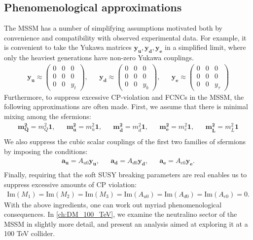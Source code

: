 \subsection{Phenomenological approximations}
The MSSM has a number of simplifying assumptions motivated both by convenience and compatibility with observed experimental data. For example, it is convenient to take the Yukawa matrices $\mathbf{y_u,y_d,y_e}$ in a simplified limit, where only the heaviest generations have non-zero Yukawa couplings. 
\begin{align*}
  \mathbf{y_u} \approx \begin{pmatrix}
    0 & 0 & 0\\
    0 & 0 & 0\\
    0 & 0 & y_t
  \end{pmatrix},&&
  \mathbf{y_d} \approx \begin{pmatrix}
    0 & 0 & 0\\
    0 & 0 & 0\\
    0 & 0 & y_b
  \end{pmatrix},&&
  \mathbf{y_e} \approx \begin{pmatrix}
    0 & 0 & 0\\
    0 & 0 & 0\\
    0 & 0 & y_\tau
  \end{pmatrix}
\end{align*}
Furthermore, to suppress excessive CP-violation and FCNCs in the MSSM, the following approximations are often made. First, we assume that there is minimal mixing among the sfermions:
\begin{align*}
  \mathbf{m_Q^2} = m_Q^2\mathbf{1},&&
  \mathbf{m_{\bar{u}}^2} = m_{\bar{u}}^2\mathbf{1},&&
  \mathbf{m_{\bar{d}}^2} = m_{\bar{d}}^2\mathbf{1},&&
  \mathbf{m_{\bar{e}}^2} = m_{\bar{e}}^2\mathbf{1},&&
  \mathbf{m_{\bar{L}}^2} = m_{\bar{L}}^2\mathbf{1}\\
\end{align*}
We also suppress the cubic scalar couplings of the first two families of sfermions by imposing the conditions: 
\begin{align*}
  \mathbf{a_u} = A_{u0}\mathbf{y_u},&&
  \mathbf{a_d} = A_{d0}\mathbf{y_d},&&
  \mathbf{a_e} = A_{e0}\mathbf{y_e}.\\
\end{align*}
Finally, requiring that the soft SUSY breaking parameters are real enables us to suppress excessive amounts of CP violation:
\begin{align*}
  \text{Im}(M_1)=
  \text{Im}(M_2)=
  \text{Im}(M_3)=
  \text{Im}(A_{u0})=
  \text{Im}(A_{d0})=
  \text{Im}(A_{e0})=0.
\end{align*}
With the above ingredients, one can work out myriad phenomenological consequences. In \autoref{ch:DM_100_TeV}, we examine the neutralino sector of the MSSM in slightly more detail, and present an analysis aimed at exploring it at a 100 TeV collider.
